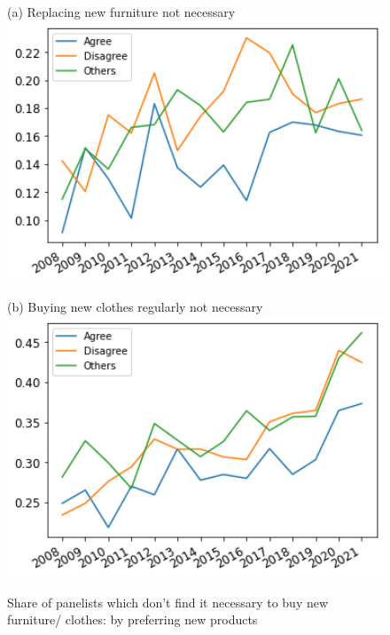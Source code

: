 \documentclass[12pt]{article}
\begin{document}
\begin{figure}[h!!]
	\centering	
	\caption{Share of panelists which don't find it necessary to buy new furniture/ clothes: by preferring new products}\label{fig:evolution_notNecessary_bygroup:NewProducts}	
	\begin{minipage}[h!!]{0.32\textwidth}  
		\centering\footnotesize{(a) Replacing new furniture not necessary}
		\includegraphics[width=1\textwidth]{../codding_data/results/liss/broad_groups_notnecessaryqk20a148_ci307.png}
	\end{minipage}
	\begin{minipage}[h!!]{0.32\textwidth}
		\centering\footnotesize{(b) Buying new clothes regularly not necessary}
		\includegraphics[width=1\textwidth]{../codding_data/results/liss/broad_groups_notnecessaryqk20a148_ci306.png}
	\end{minipage}
\end{figure}
\end{document}
